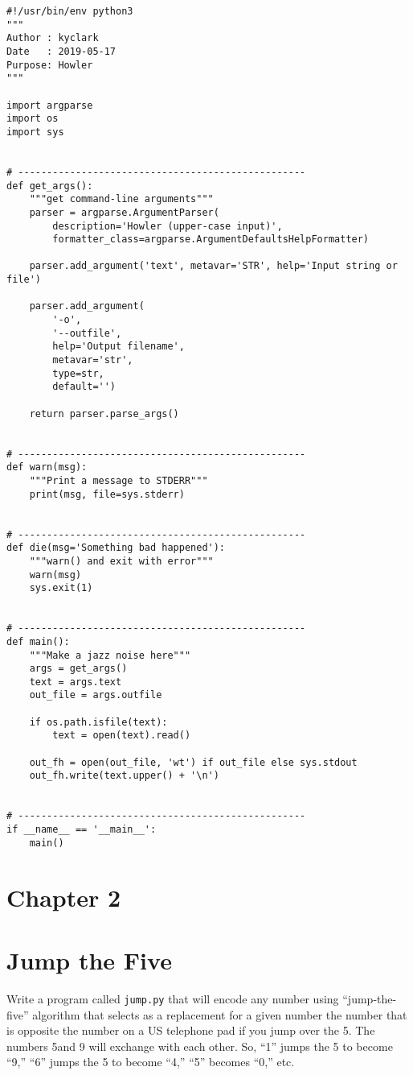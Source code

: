 \documentclass[]{article}
\begin{document}
\begin{verbatim}
#!/usr/bin/env python3
"""
Author : kyclark
Date   : 2019-05-17
Purpose: Howler
"""

import argparse
import os
import sys


# --------------------------------------------------
def get_args():
    """get command-line arguments"""
    parser = argparse.ArgumentParser(
        description='Howler (upper-case input)',
        formatter_class=argparse.ArgumentDefaultsHelpFormatter)

    parser.add_argument('text', metavar='STR', help='Input string or file')

    parser.add_argument(
        '-o',
        '--outfile',
        help='Output filename',
        metavar='str',
        type=str,
        default='')

    return parser.parse_args()


# --------------------------------------------------
def warn(msg):
    """Print a message to STDERR"""
    print(msg, file=sys.stderr)


# --------------------------------------------------
def die(msg='Something bad happened'):
    """warn() and exit with error"""
    warn(msg)
    sys.exit(1)


# --------------------------------------------------
def main():
    """Make a jazz noise here"""
    args = get_args()
    text = args.text
    out_file = args.outfile

    if os.path.isfile(text):
        text = open(text).read()

    out_fh = open(out_file, 'wt') if out_file else sys.stdout
    out_fh.write(text.upper() + '\n')


# --------------------------------------------------
if __name__ == '__main__':
    main()
\end{verbatim}

\pagebreak

\hypertarget{chapter-2}{%
\section{Chapter 2}\label{chapter-2}}

\hypertarget{jump-the-five}{%
\section{Jump the Five}\label{jump-the-five}}

Write a program called \texttt{jump.py} that will encode any number
using ``jump-the-five'' algorithm that selects as a replacement for a
given number the number that is opposite the number on a US telephone
pad if you jump over the 5. The numbers 5and 9 will exchange with each
other. So, ``1'' jumps the 5 to become ``9,'' ``6'' jumps the 5 to
become ``4,'' ``5'' becomes ``0,'' etc.
\end{document}
